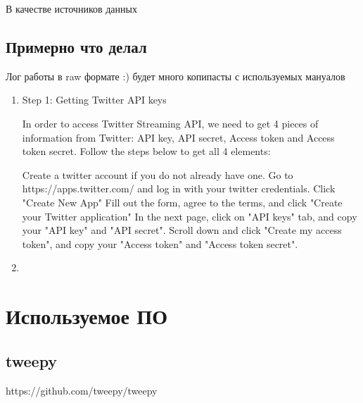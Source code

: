 \documentclass[12pt,a4paper,oneside]{extarticle}
\begin{document}
    В качестве источников данных 

    \subsection{Примерно что делал}
        Лог работы в raw формате :) будет много копипасты с используемых мануалов
 \begin{enumerate}
    \item Step 1: Getting Twitter API keys

        In order to access Twitter Streaming API, we need to get 4 pieces of information from Twitter: API key, API secret, Access token and Access token secret. Follow the steps below to get all 4 elements:

        Create a twitter account if you do not already have one.
        Go to https://apps.twitter.com/ and log in with your twitter credentials.
        Click "Create New App"
        Fill out the form, agree to the terms, and click "Create your Twitter application"
        In the next page, click on "API keys" tab, and copy your "API key" and "API secret".
        Scroll down and click "Create my access token", and copy your "Access token" and "Access token secret".
    \item 
    \end{enumerate}

\section{Используемое ПО}
    \subsection{tweepy}
        https://github.com/tweepy/tweepy
\end{document}
